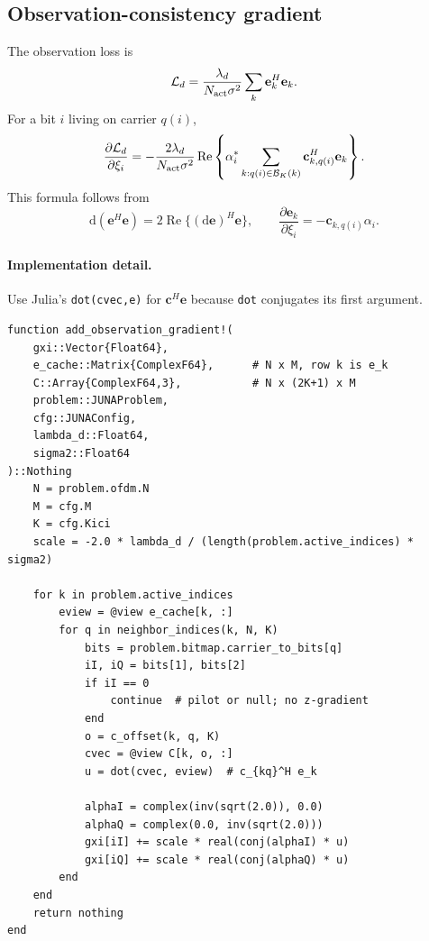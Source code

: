 \documentclass[11pt]{article}
\newcommand{\dd}{\mathrm{d}}
\newcommand{\re}{\operatorname{Re}}
\begin{document}
\subsection{Observation-consistency gradient}

The observation loss is
\begin{equation}
\mathcal L_d
=\frac{\lambda_d}{N_{\rm act}\sigma^2}
\sum_k \mathbf e_k^H\mathbf e_k.
\end{equation}
For a bit $i$ living on carrier $q(i)$,
\begin{equation}
\frac{\partial \mathcal L_d}{\partial \xi_i}
= -\frac{2\lambda_d}{N_{\rm act}\sigma^2}
\re\left\{
\alpha_i^*\sum_{k:q(i)\in\mathcal B_K(k)}
\mathbf c_{k,q(i)}^H\mathbf e_k
\right\}.
\label{eq:grad_obs}
\end{equation}
This formula follows from
\begin{equation}
\dd\left(\mathbf e^H\mathbf e\right)=2\re\{(\dd\mathbf e)^H\mathbf e\},
\qquad
\frac{\partial\mathbf e_k}{\partial\xi_i}=-\mathbf c_{k,q(i)}\alpha_i.
\end{equation}

\paragraph{Implementation detail.}
Use Julia's \texttt{dot(cvec,e)} for $\mathbf c^H\mathbf e$ because \texttt{dot} conjugates its first argument.

\begin{lstlisting}
function add_observation_gradient!(
    gxi::Vector{Float64},
    e_cache::Matrix{ComplexF64},      # N x M, row k is e_k
    C::Array{ComplexF64,3},           # N x (2K+1) x M
    problem::JUNAProblem,
    cfg::JUNAConfig,
    lambda_d::Float64,
    sigma2::Float64
)::Nothing
    N = problem.ofdm.N
    M = cfg.M
    K = cfg.Kici
    scale = -2.0 * lambda_d / (length(problem.active_indices) * sigma2)

    for k in problem.active_indices
        eview = @view e_cache[k, :]
        for q in neighbor_indices(k, N, K)
            bits = problem.bitmap.carrier_to_bits[q]
            iI, iQ = bits[1], bits[2]
            if iI == 0
                continue  # pilot or null; no z-gradient
            end
            o = c_offset(k, q, K)
            cvec = @view C[k, o, :]
            u = dot(cvec, eview)  # c_{kq}^H e_k

            alphaI = complex(inv(sqrt(2.0)), 0.0)
            alphaQ = complex(0.0, inv(sqrt(2.0)))
            gxi[iI] += scale * real(conj(alphaI) * u)
            gxi[iQ] += scale * real(conj(alphaQ) * u)
        end
    end
    return nothing
end
\end{lstlisting}
\end{document}
